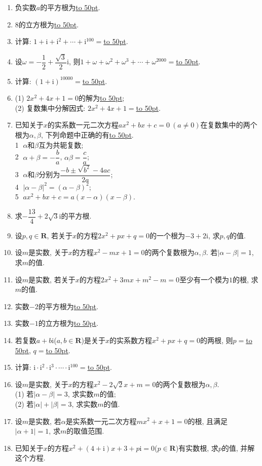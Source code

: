 \documentclass[10pt,a4paper]{article}
\newcommand{\blank}[1]{\underline{\hbox to #1pt{}}}
\begin{document}
\begin{enumerate}[1.]
\item 负实数$a$的平方根为\blank{50}.
\item $8$的立方根为\blank{50}.
\item 计算: $1+\mathrm{i}+\mathrm{i}^2+\cdots+\mathrm{i}^{100}=$\blank{50}.
\item 设$\omega=-\dfrac 12+\dfrac{\sqrt 3}2\mathrm{i}$, 则$1+\omega+\omega^2+\omega^3+\cdots+\omega^{2000}=$\blank{50}.
\item 计算: $(1+\mathrm{i})^{10000}=$\blank{50}.
\item (1) $2x^2+4x+1=0$的解为\blank{50};\\
(2) 复数集中分解因式: $2x^2+4x+1=$\blank{50}.
\item 已知关于$x$的实系数一元二次方程$ax^2+bx+c=0\ (a\ne 0)$在复数集中的两个根为$\alpha,\beta$, 下列命题中正确的有\blank{50}.\\
\textcircled{1} $\alpha$和$\beta$互为共轭复数;\\
\textcircled{2} $\alpha +\beta =-\dfrac ba$, $\alpha \beta =\dfrac ca$;\\
\textcircled{3} $\alpha$和$\beta$分别为$\dfrac{-b\pm \sqrt{b^2}-4ac}{2a}$;\\
\textcircled{4} $|\alpha -\beta|^2=(\alpha-\beta)^2$;\\
\textcircled{5} $ax^2+bx+c=a(x-\alpha)(x-\beta)$.
\item 求$-\dfrac{13}4+2\sqrt 3\mathrm{i}$的平方根.
\item 设$p,q\in \mathbf{R}$, 若关于$x$的方程$2x^2+px+q=0$的一个根为$-3+2\mathrm{i}$, 求$p,q$的值.
\item 设$m$是实数, 关于$x$的方程$x^2-mx+1=0$的两个复数根为$\alpha,\beta$. 若$|\alpha-\beta|=1$, 求$m$的值.
\item 设$m$是实数, 若关于$x$的方程$2x^2+3mx+m^2-m=0$至少有一个模为$1$的根, 求$m$的值.
\item 实数$-2$的平方根为\blank{50}.
\item 实数$-1$的立方根为\blank{50}.
\item 若复数$a+b\mathrm{i}$($a,b\in \mathbf{R}$)是关于$x$的实系数方程$x^2+px+q=0$的两根, 则$p=$\blank{50}, $q=$\blank{50}.
\item 计算: $\mathrm{i}\cdot\mathrm{i}^2\cdot\mathrm{i}^3\cdot \cdots \cdot \mathrm{i}^{100}=$\blank{50}.
\item 设$m$是实数, 关于$x$的方程$x^2-2\sqrt 2x+m=0$的两个复数根为$\alpha,\beta$.\\
(1) 若$|\alpha-\beta|=3$, 求实数$m$的值;\\
(2) 若$|\alpha|+|\beta|=3$, 求实数$m$的值.
\item 设$m$是实数, 若$\alpha$是实系数一元二次方程$mx^2+x+1=0$的根, 且满足$|\alpha+1|=1$, 求$m$的取值范围.
\item 已知关于$x$的方程$x^2+(4+\mathrm{i})x+3+p\mathrm{i}=0$($p\in \mathbf{R}$)有实数根, 求$p$的值, 并解这个方程.


\end{enumerate}
\end{document}
